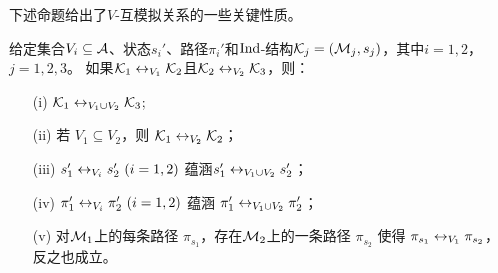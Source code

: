 下述命题给出了$V$-互模拟关系的一些关键性质。
\begin{proposition}\label{prop:bisimilar:V}
	给定集合$V_i\subseteq {\cal A}$、状态$s_i'$、路径$\pi_i'$和$\textrm{Ind}$-结构${\cal K}_j=({\cal M}_j,s_j)$，其中$i=1,2$，$j=1,2,3$。
	如果${\cal K}_1 \leftrightarrow_{V_1} {\cal K}_2$且${\cal K}_2 \leftrightarrow_{V_2} {\cal K}_3$，则：
	\begin{itemize}
		\item[(i)] ${\cal K}_1\leftrightarrow_{V_1\cup V_2}{\cal K}_3$;
		\item[(ii)] 若 $V_1 \subseteq V_2$，则 ${\cal K}_1 \leftrightarrow_{V_2} {\cal K}_2$；
		\item[(iii)] $s_1'\leftrightarrow_{V_i}s_2'~(i=1,2)$ 蕴涵$s_1'\leftrightarrow_{V_1\cup V_2}s_2'$；
		\item[(iv)] $\pi_1'\leftrightarrow_{V_i}\pi_2'~(i=1,2)$ 蕴涵 $\pi_1'\leftrightarrow_{V_1\cup V_2}\pi_2'$；
		\item[(v)] 对${\cal M}_1$上的每条路径 $\pi_{s_1}$，存在${\cal M}_2$上的一条路径 $\pi_{s_2}$ 使得 $\pi_{s_1} \leftrightarrow_{V_1} \pi_{s_2}$，反之也成立。
	\end{itemize}
\end{proposition}
